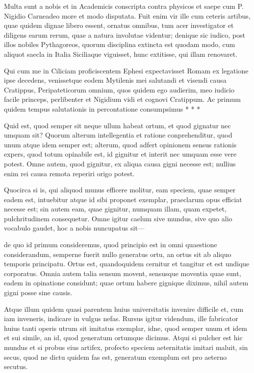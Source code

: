 
 Multa sunt a nobis et in Academicis conscripta contra physicos et saepe cum P. Nigidio Carneadeo more et modo disputata. Fuit enim vir ille cum ceteris artibus, quae quidem dignae libero essent, ornatus omnibus, tum acer investigator et diligens earum rerum, quae a natura involutae videntur; denique sic iudico, post illos nobiles Pythagoreos, quorum disciplina extincta est quodam modo, cum aliquot saecla in Italia Siciliaque viguisset, hunc extitisse, qui illam renovaret.

 Qui cum me in Ciliciam proficiscentem Ephesi expectavisset Romam ex legatione ipse decedens, venissetque eodem Mytilenis mei salutandi et visendi causa Cratippus, Peripateticorum omnium, quos quidem ego audierim, meo iudicio facile princeps, perlibenter et Nigidium vidi et cognovi Cratippum. Ac primum quidem tempus salutationis in percontatione consumpsimus * * *

 Quid est, quod semper sit neque ullum habeat ortum, et quod gignatur nec umquam sit? Quorum alterum intellegentia et ratione conprehenditur, quod unum atque idem semper est; alterum, quod adfert opinionem sensus rationis expers, quod totum opinabile est, id gignitur et interit nec umquam esse vere potest. Omne autem, quod gignitur, ex aliqua causa gigni necesse est; nullius enim rei causa remota reperiri origo potest.

 Quocirca si is, qui aliquod munus efficere molitur, eam speciem, quae semper eadem est, intuebitur atque id sibi proponet exemplar, praeclarum opus efficiat necesse est; sin autem eam, quae gignitur, numquam illam, quam expetet, pulchritudinem consequetur. Omne igitur caelum sive mundus, sive quo alio vocabulo gaudet, hoc a nobis nuncupatus sit—

 de quo id primum consideremus, quod principio est in omni quaestione considerandum, semperne fuerit nullo generatus ortu, an ortus sit ab aliquo temporis principatu. Ortus est, quandoquidem cernitur et tangitur et est undique corporatus. Omnia autem talia sensum movent, sensusque moventia quae sunt, eadem in opinatione considunt; quae ortum habere gignique diximus, nihil autem gigni posse sine causis.

 Atque illum quidem quasi parentem huius universitatis invenire difficile et, cum iam inveneris, indicare in vulgus nefas. Rursus igitur videndum, ille fabricator huius tanti operis utrum sit imitatus exemplar, idne, quod semper unum et idem et sui simile, an id, quod generatum ortumque dicimus. Atqui si pulcher est hic mundus et si probus eius artifex, profecto speciem aeternitatis imitari maluit, sin secus, quod ne dictu quidem fas est, generatum exemplum est pro aeterno secutus.

